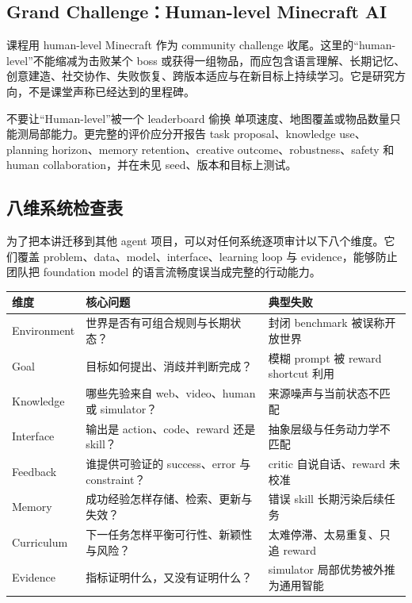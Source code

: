 \subsection{Grand Challenge：Human-level Minecraft AI}

课程用 human-level Minecraft 作为 community challenge 收尾。这里的“human-level”不能缩减为击败某个 boss 或获得一组物品，而应包含语言理解、长期记忆、创意建造、社交协作、失败恢复、跨版本适应与在新目标上持续学习。它是研究方向，不是课堂声称已经达到的里程碑。


\begin{warningbox}{不要让“Human-level”被一个 leaderboard 偷换}
单项速度、地图覆盖或物品数量只能测局部能力。更完整的评价应分开报告 task proposal、knowledge use、planning horizon、memory retention、creative outcome、robustness、safety 和 human collaboration，并在未见 seed、版本和目标上测试。
\end{warningbox}


\subsection{八维系统检查表}

为了把本讲迁移到其他 agent 项目，可以对任何系统逐项审计以下八个维度。它们覆盖 problem、data、model、interface、learning loop 与 evidence，能够防止团队把 foundation model 的语言流畅度误当成完整的行动能力。

\begin{longtable}{@{}L{0.18\textwidth}L{0.34\textwidth}L{0.36\textwidth}@{}}
\toprule
维度 & 核心问题 & 典型失败 \\
\midrule
Environment & 世界是否有可组合规则与长期状态？ & 封闭 benchmark 被误称开放世界 \\
Goal & 目标如何提出、消歧并判断完成？ & 模糊 prompt 被 reward shortcut 利用 \\
Knowledge & 哪些先验来自 web、video、human 或 simulator？ & 来源噪声与当前状态不匹配 \\
Interface & 输出是 action、code、reward 还是 skill？ & 抽象层级与任务动力学不匹配 \\
Feedback & 谁提供可验证的 success、error 与 constraint？ & critic 自说自话、reward 未校准 \\
Memory & 成功经验怎样存储、检索、更新与失效？ & 错误 skill 长期污染后续任务 \\
Curriculum & 下一任务怎样平衡可行性、新颖性与风险？ & 太难停滞、太易重复、只追 reward \\
Evidence & 指标证明什么，又没有证明什么？ & simulator 局部优势被外推为通用智能 \\
\bottomrule
\end{longtable}

